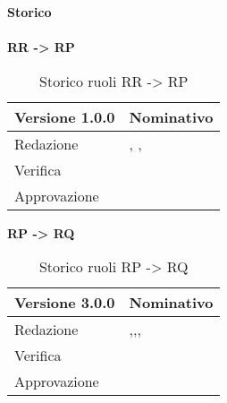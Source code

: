 \newpage
\Large{\textbf{Storico }}\\
\normalsize \\

\textbf{RR -> RP}
\label{tabVers1}
\begin{table}[h]
	\begin{tabular}{p{} p{}}
		\toprule \textbf{Versione 1.0.0}	&	\textbf{Nominativo}\\
		\midrule Redazione	& \FM, \TP, \VG\\
		\midrule Verifica &	\GP\\
		\midrule Approvazione	& \PM\\
		\bottomrule
	\end{tabular}
	\caption{Storico ruoli RR -> RP}
\end{table}

\textbf{RP -> RQ}
\label{tabVers2}
\begin{table}[h]
	\begin{tabular}{p{} p{}}
		\toprule \textbf{Versione 3.0.0}	&	\textbf{Nominativo}\\
		\midrule Redazione	&  \VG,\PM,\BM,\TP\\
		\midrule Verifica &	\GP\\
		\midrule Approvazione	& \FM\\
		\bottomrule
	\end{tabular}
	\caption{Storico ruoli RP -> RQ}
\end{table}